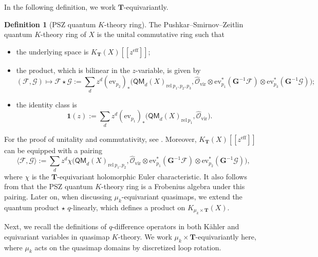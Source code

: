 \documentclass[reqno]{amsart}
\numberwithin{equation}{section}
\numberwithin{equation}{section}
\numberwithin{equation}{section}
\theoremstyle{definition}
\newtheorem{defn}[thm]{Definition}
\theoremstyle{remark}
\theoremstyle{remark}
\begin{document}
In the following definition, we work $\mathbf{T}$-equivariantly.
\begin{defn}[PSZ quantum $K$-theory ring]
    The Pushkar--Smirnov--Zeitlin quantum $K$-theory ring of $X$ is the unital commutative ring such that 
    \begin{itemize}
    \item the underlying space is $K_{\mathbf{T}}(X)[\![ z^{\mathrm{eff}} ]\!]$;
    \item the product, which is bilinear in the $z$-variable, is given by
    \begin{equation}
        (\mathcal{F}, \mathcal{G}) \mapsto \mathcal{F} \star \mathcal{G} := \sum_{d} z^d (\mathrm{ev}_{p_2})_* \big(\mathsf{QM}_d(X)_{\mathrm{rel} \ p_1, p_2, p_3 }, \hat{\mathcal{O}}_{\mathrm{vir}} \otimes \mathrm{ev}_{p_1}^* (\mathbf{G}^{-1} \mathcal{F}) \otimes \mathrm{ev}_{p_3}^* (\mathbf{G}^{-1} \mathcal{G}) \big);
    \end{equation}
    \item the identity class is 
    \begin{equation}
        \mathbf{1}(z) := \sum_d z^d (\mathrm{ev}_{p_1})_* \big( \mathsf{QM}_d(X)_{\mathrm{rel} \ p_1}, \hat{\mathcal{O}}_{\mathrm{vir}} \big).
    \end{equation}
    \end{itemize}
\end{defn}
For the proof of unitality and commutativity, see \cite[Section 3]{PSZ-quantum}. Moreover, $K_{\mathbf{T}}(X)[\![ z^{\mathrm{eff}} ]\!]$ can be equipped with a pairing
\begin{equation}
    \langle \mathcal{F}, \mathcal{G} \rangle := \sum_d z^d \chi\big(\mathsf{QM}_d(X)_{\mathrm{rel} \ p_1, p_2}, \hat{\mathcal{O}}_{\mathrm{vir}} \otimes \mathrm{ev}_{p_1}^* (\mathbf{G}^{-1} \mathcal{F}) \otimes \mathrm{ev}_{p_2}^* (\mathbf{G}^{-1} \mathcal{G}) \big),
\end{equation}
where $\chi$ is the $\mathbf{T}$-equivariant holomorphic Euler characteristic. It also follows from \cite[Section 3]{PSZ-quantum} that the PSZ quantum $K$-theory ring is a Frobenius algebra under this pairing. Later on, when discussing $\mu_k$-equivariant quasimaps, we extend the quantum product $\star$ $q$-linearly, which defines a product on $K_{\mu_k \times \mathbf{T}}(X)$.

Next, we recall the definitions of $q$-difference operators in both K\"ahler and equivariant variables in quasimap $K$-theory. We work $\mu_k \times \mathbf{T}$-equivariantly here, where $\mu_k$ acts on the quasimap domains by discretized loop rotation.
\end{document}

